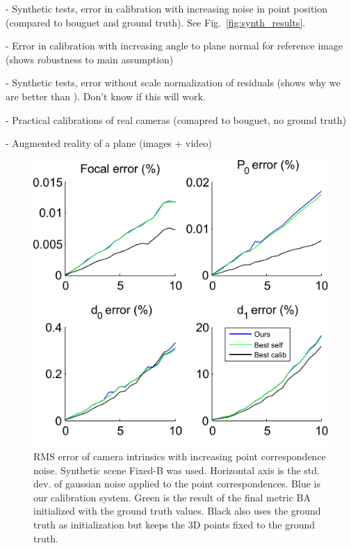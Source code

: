 \documentclass[10pt,twocolumn,letterpaper]{article}
\begin{document}
- Synthetic tests, error in calibration with increasing noise in point position (compared to bouguet and ground truth). See Fig.~\ref{fig:synth_results}.

- Error in calibration with increasing angle to plane normal for reference image (shows robustness to main assumption)

- Synthetic tests, error without scale normalization of residuals (shows why we are better than \cite{bocquillon2006}). Don't know if this will work.

- Practical calibrations of real cameras (comapred to bouguet, no ground truth)

- Augmented reality of a plane (images + video)

\begin{figure}
\centering
\includegraphics[width=\linewidth]{images/resultsPointNoise.pdf}
\caption{RMS error of camera intrinsics with increasing point correspondence noise. Synthetic scene Fixed-B was used. Horizontal axis is the std. dev. of gaussian noise applied to the point correspondences. Blue is our calibration system. Green is the result of the final metric BA initialized with the ground truth values. Black also uses the ground truth as initialization but keeps the 3D points fixed to the ground truth.}
\label{fig:results_noise}
\end{figure}
\end{document}
